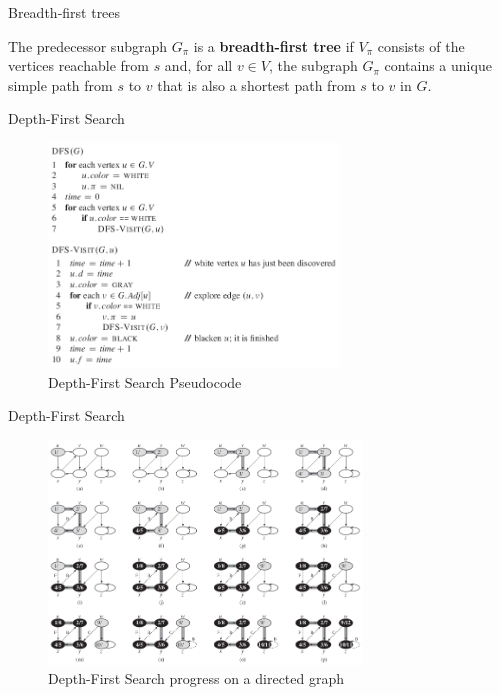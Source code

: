 \documentclass[ignorenonframetext,]{beamer}
\begin{document}
\begin{frame}{Breadth-first trees}
\protect\hypertarget{breadth-first-trees}{}

The predecessor subgraph \(G_{\pi}\) is a \textbf{breadth-ﬁrst tree} if
\(V_{\pi}\) consists of the vertices reachable from \(s\) and, for all
\(v \in V\), the subgraph \(G_{\pi}\) contains a unique simple path from
\(s\) to \(v\) that is also a shortest path from \(s\) to \(v\) in
\(G\).

\end{frame}

\begin{frame}{Depth-First Search}
\protect\hypertarget{depth-first-search}{}

\begin{figure}
\centering
\includegraphics[width=\textwidth,height=2.34375in]{depth-first-search-pseudocode.png}
\caption{Depth-First Search Pseudocode}
\end{figure}

\end{frame}

\begin{frame}{Depth-First Search}
\protect\hypertarget{depth-first-search-1}{}

\begin{figure}
\centering
\includegraphics[width=\textwidth,height=2.34375in]{progress-dfs-directed-graph.png}
\caption{Depth-First Search progress on a directed graph}
\end{figure}

\end{frame}
\end{document}
